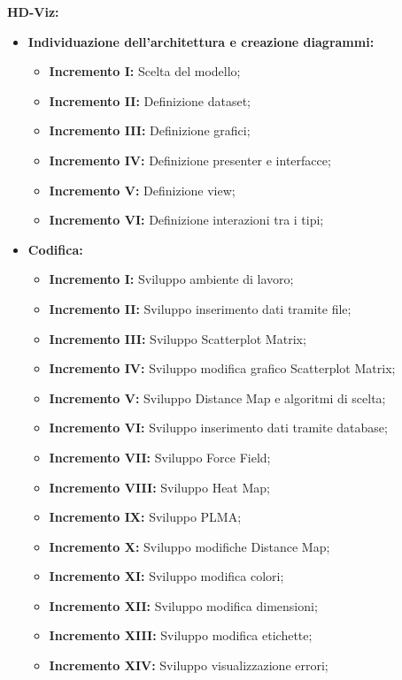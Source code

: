 \documentclass[../piano_di_progetto.tex]{subfiles}
\begin{document}
\textbf{HD-Viz:}
\begin{itemize}
    \item \textbf{Individuazione dell'architettura e creazione diagrammi:}
    \begin{itemize}
        \item \textbf{Incremento I:} Scelta del modello;
        \item \textbf{Incremento II:} Definizione dataset;
        \item \textbf{Incremento III:} Definizione grafici;
        \item \textbf{Incremento IV:} Definizione presenter e interfacce;
        \item \textbf{Incremento V:} Definizione view;
        \item \textbf{Incremento VI:} Definizione interazioni tra i tipi;      
    \end{itemize}

    \item \textbf{Codifica:}
    \begin{itemize}
        \item \textbf{Incremento I:} Sviluppo ambiente di lavoro;
        \item \textbf{Incremento II:} Sviluppo inserimento dati tramite file;
        \item \textbf{Incremento III:} Sviluppo Scatterplot Matrix;
        \item \textbf{Incremento IV:} Sviluppo modifica grafico Scatterplot Matrix;
        \item \textbf{Incremento V:} Sviluppo Distance Map e algoritmi di scelta;
	
        \item \textbf{Incremento VI:} Sviluppo inserimento dati tramite database;
        \item \textbf{Incremento VII:} Sviluppo Force Field;
        \item \textbf{Incremento VIII:} Sviluppo Heat Map;
        \item \textbf{Incremento IX:} Sviluppo PLMA;
        \item \textbf{Incremento X:} Sviluppo modifiche Distance Map;
        \item \textbf{Incremento XI:} Sviluppo modifica colori;
        \item \textbf{Incremento XII:} Sviluppo modifica dimensioni;
        \item \textbf{Incremento XIII:} Sviluppo modifica etichette;
        \item \textbf{Incremento XIV:} Sviluppo visualizzazione errori;
    \end{itemize}
\end{itemize}
\end{document}
